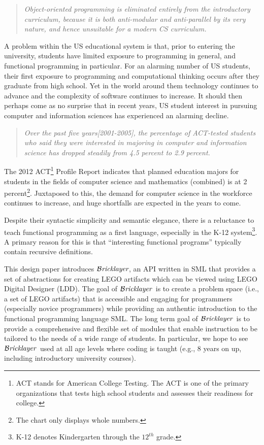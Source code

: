 \documentclass[submission,copyright,creativecommons]{eptcs}
\newcommand{\bricklayer}{\ensuremath{\mathcal{B}\emph{ricklayer}}}
\begin{document}
\begin{quote}
\emph{Object-oriented programming is eliminated entirely from the introductory curriculum, because it is both anti-modular and anti-parallel by its very nature, and hence unsuitable for a modern CS curriculum. \cite{existential-type}}
\end{quote}


A problem within the US educational system is that, prior to entering the university, students have limited exposure to programming in general, and functional programming in particular. For an alarming number of US students, their first exposure to programming and computational thinking occurs after they graduate from high school. Yet in the world around them technology continues to advance and the complexity of software continues to increase. It should then perhaps come as no surprise that in recent years, US student interest in pursuing computer and information sciences has experienced an alarming decline.

\begin{quote}
\emph{Over the past five years[2001-2005], the percentage of ACT-tested students who said they were interested in majoring in computer and information science has dropped steadily from 4.5 percent to 2.9 percent.} \cite{ACT:2006-STEM-Pipeline}
\end{quote}

The 2012 ACT\footnote{ACT stands for American College Testing. The ACT is one of the primary organizations that tests high school students and assesses their readiness for college.} Profile Report indicates that planned education majors for students in the fields of computer science and mathematics (combined) is at 2 percent\footnote{The chart only displays whole numbers.}. Juxtaposed to this, the demand for computer science in the workforce continues to increase, and huge shortfalls are expected in the years to come.

Despite their syntactic simplicity and semantic elegance, there is a reluctance to teach functional programming as a first language, especially in the K-12 system\footnote{K-12 denotes Kindergarten through the $12^{th}$ grade.}. A primary reason for this is that ``interesting functional programs'' typically contain recursive definitions.



This design paper introduces \bricklayer, an API written in SML that provides a set of abstractions for creating LEGO artifacts which can be viewed using LEGO Digital Designer (LDD). The goal of \bricklayer\ is to create a problem space (i.e., a set of LEGO artifacts) that is accessible and engaging for programmers (especially novice programmers) while providing an authentic introduction to the functional programming language SML. The long term goal of \bricklayer\ is to provide a comprehensive and flexible set of modules that enable instruction to be tailored to the needs of a wide range of students. In particular, we hope to see \bricklayer\ used at all age levels where coding is taught (e.g., 8 years on up, including introductory university courses).
\end{document}
